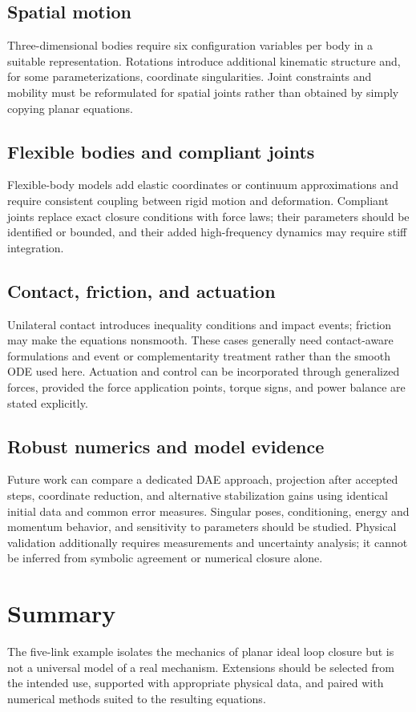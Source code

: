 \documentclass[../main.tex]{subfiles}
\begin{document}
\subsection{Spatial motion}
Three-dimensional bodies require six configuration variables per body in a suitable representation. Rotations introduce additional kinematic structure and, for some parameterizations, coordinate singularities. Joint constraints and mobility must be reformulated for spatial joints rather than obtained by simply copying planar equations.

\subsection{Flexible bodies and compliant joints}
Flexible-body models add elastic coordinates or continuum approximations and require consistent coupling between rigid motion and deformation. Compliant joints replace exact closure conditions with force laws; their parameters should be identified or bounded, and their added high-frequency dynamics may require stiff integration.

\subsection{Contact, friction, and actuation}
Unilateral contact introduces inequality conditions and impact events; friction may make the equations nonsmooth. These cases generally need contact-aware formulations and event or complementarity treatment rather than the smooth ODE used here. Actuation and control can be incorporated through generalized forces, provided the force application points, torque signs, and power balance are stated explicitly.

\subsection{Robust numerics and model evidence}
Future work can compare a dedicated DAE approach, projection after accepted steps, coordinate reduction, and alternative stabilization gains using identical initial data and common error measures. Singular poses, conditioning, energy and momentum behavior, and sensitivity to parameters should be studied. Physical validation additionally requires measurements and uncertainty analysis; it cannot be inferred from symbolic agreement or numerical closure alone.

\section{Summary}
The five-link example isolates the mechanics of planar ideal loop closure but is not a universal model of a real mechanism. Extensions should be selected from the intended use, supported with appropriate physical data, and paired with numerical methods suited to the resulting equations.

\ifSubfilesClassLoaded{\backmatter\bookbibliography}{}
\end{document}
